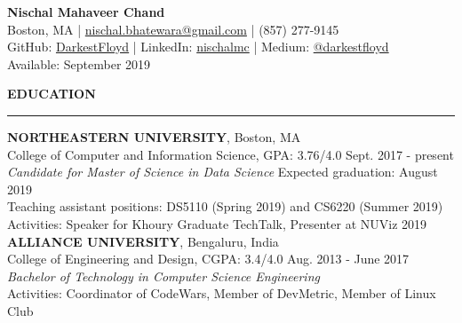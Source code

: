 \documentclass[a4paper]{article}
\newcommand{\myline}{\par
  \kern2pt %
  \hrule height 0.5pt
  \kern2pt %
}
\begin{document}
	\begin{center}
		{\Large \textbf{Nischal Mahaveer Chand}} \\
    Boston, MA | \href{mailto:nischal.bhatewara@gmail.com}{nischal.bhatewara@gmail.com} | 
    (857) 277-9145 \\
                GitHub: \href{https://github.com/DarkestFloyd}{DarkestFloyd} | 
                LinkedIn: \href{https://www.linkedin.com/in/nischalmc}{nischalmc} |
		Medium: \href{https://medium.com/@darkestfloyd}{@darkestfloyd} \\
		Available: September 2019 \\
	\end{center}
	
	\noindent
	{\large \textbf{EDUCATION}}
	\myline 
	\smallskip
	
	\noindent
	\textbf{NORTHEASTERN UNIVERSITY}, Boston, MA \\
	College of Computer and Information Science, GPA: 3.76/4.0 
        \hfill Sept. 2017 - present \\
	\textit{Candidate for Master of Science in Data Science} 
        \hfill Expected graduation: August 2019 \\
  Teaching assistant positions: DS5110 (Spring 2019) and CS6220 (Summer 2019) \\
  Activities: Speaker for Khoury Graduate TechTalk, Presenter at NUViz 2019 	\\

	\noindent
	\textbf{ALLIANCE UNIVERSITY}, Bengaluru, India \\
  College of Engineering and Design, CGPA: 3.4/4.0 \hfill Aug. 2013 - June 2017 \\
	\textit{Bachelor of Technology in Computer Science Engineering} \\
	Activities: Coordinator of CodeWars, Member of DevMetric, Member of Linux 
        Club \\
	
\end{document}
